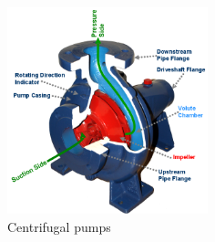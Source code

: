 \begin{figure}[ht]
\begin{center}
\includegraphics[width=0.52\textwidth]{figs/Centrifugal_Pump.png}
\caption{\label{fig:centrifual_pumps}Centrifugal pumps}
\end{center}
\end{figure}



